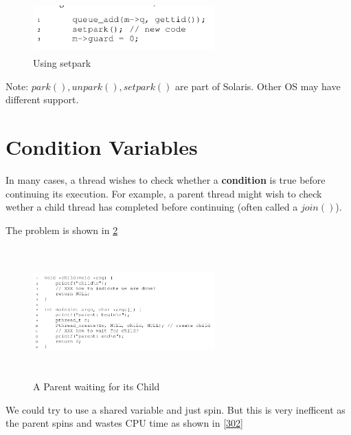 \begin{figure}[h!]
    \label{setpark}
    \begin{center}
        \includegraphics[width=7cm, height=2cm]{img/setpark.png}
        \caption{Using setpark}
    \end{center}
\end{figure}

Note: $park(), unpark(), setpark()$ are part of Solaris. Other OS may have 
different support.

\section{Condition Variables}

In many cases, a thread wishes to check whether a \textbf{condition} is true
before continuing its execution. For example, a parent thread might wish
to check wether a child thread has completed before continuing (often called a
$join()$).

The problem is shown in \ref{301}

\begin{figure}[h!]
    \label{301}
    \begin{center}
        \includegraphics[width=7cm, height=5cm]{img/301.png}
        \caption{A Parent waiting for its Child}
    \end{center}
\end{figure}

We could try to use a shared variable and just spin. But this is very inefficent
as the parent spins and wastes CPU time as shown in \ref{302}

